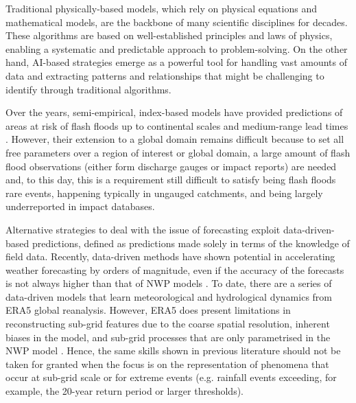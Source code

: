 Traditional physically-based models, which rely on physical equations and mathematical models, are the backbone of many scientific disciplines for decades. These algorithms are based on well-established principles and laws of physics, enabling a systematic and predictable approach to problem-solving. On the other hand, AI-based strategies emerge as a powerful tool for handling vast amounts of data and extracting patterns and relationships that might be challenging to identify through traditional algorithms.

Over the years, semi-empirical, index-based models have provided predictions of areas at risk of flash floods up to continental scales \citep{Ma_2021} and medium-range lead times \citep{Alfieri_2015a, Raynaud_2015}. However, their extension to a global domain remains difficult because to set all free parameters over a region of interest or global domain, a large amount of flash flood observations (either form discharge gauges or impact reports) are needed and, to this day, this is a requirement still difficult to satisfy being flash floods rare events, happening typically in ungauged catchments, and being largely underreported in impact databases. 

Alternative strategies to deal with the issue of forecasting exploit data-driven-based predictions, defined as predictions made solely in terms of the knowledge of field data. Recently, data-driven methods have shown potential in accelerating weather forecasting by orders of magnitude, even if the accuracy of the forecasts is not always higher than that of NWP models \citep{Bauer_2021}. To date, there are a series of data-driven models that learn meteorological \citep{Lang_2024} and hydrological \citep{Nearing_2024} dynamics from ERA5 global reanalysis. However, ERA5 does present limitations in reconstructing sub-grid features due to the coarse spatial resolution, inherent biases in the model, and sub-grid processes that are only parametrised in the NWP model \citep{Pillosu_2025a}. Hence, the same skills shown in previous literature should not be taken for granted when the focus is on the representation of phenomena that occur at sub-grid scale or for extreme events (e.g. rainfall events exceeding, for example, the 20-year return period or larger thresholds).

